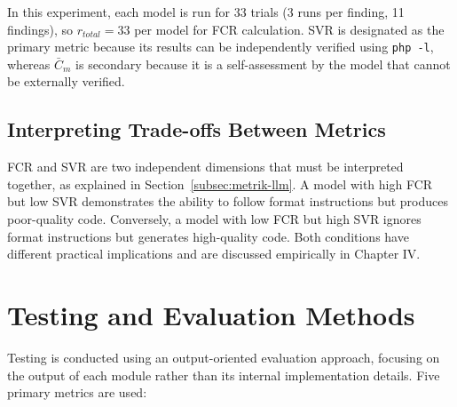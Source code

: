 In this experiment, each model is run for 33 trials (3 runs per finding, 11 findings), so $r_{total} = 33$ per model for FCR calculation. SVR is designated as the primary metric because its results can be independently verified using \texttt{php -l}, whereas $\bar{C}_m$ is secondary because it is a self-assessment by the model that cannot be externally verified.

\subsection{Interpreting Trade-offs Between Metrics}

FCR and SVR are two independent dimensions that must be interpreted together, as explained in Section~\ref{subsec:metrik-llm}. A model with high FCR but low SVR demonstrates the ability to follow format instructions but produces poor-quality code. Conversely, a model with low FCR but high SVR ignores format instructions but generates high-quality code. Both conditions have different practical implications and are discussed empirically in Chapter IV.

\section{Testing and Evaluation Methods}

Testing is conducted using an output-oriented evaluation approach, focusing on the output of each module rather than its internal implementation details. Five primary metrics are used:

